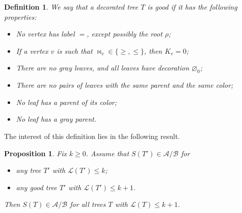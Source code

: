 \documentclass[12pt]{amsart}
\theoremstyle{plain}
\newtheorem{proposition}[lemma]{Proposition}
\newtheorem{definition}[lemma]{Definition}
\theoremstyle{remark}
\def\cL{\mathcal{L}}
\def\cA{\mathcal{A}}
\def\cB{\mathcal{B}}
\begin{document}
\begin{definition}\label{def:goodtrees}
We say that a decorated tree $T$ is \textit{good} if it has the following properties:
\begin{itemize}
\item[(i)] No vertex has label $=$, except possibly the root $\rho$;
\item[(ii)] If a vertex $v$ is such that $\bowtie_v \in \{ \geq, \leq \}$, then $K_v=0$;
\item[(iii)] There are no gray leaves, and all leaves have decoration $\varnothing_0$;
\item[(iv)] There are no pairs of leaves with the same parent and the same color;
\item[(v)] No leaf has a parent of its color;
\item[(vi)] No leaf has a gray parent.
\end{itemize}
\end{definition}


The interest of this definition lies in the following result.

\begin{proposition}
\label{prop:goodtrees}
Fix $k \ge 0$. Assume that $S(T') \in \cA/\cB$ for
\begin{itemize}
  \item any tree $T'$ with $\cL(T') \le k$;
  \item any good tree $T'$ with $\cL(T') \le k+1$.
\end{itemize}
Then $S(T) \in  \cA/\cB$
for all trees $T$ with $\cL(T) \le k+1$.
\end{proposition}
\end{document}
